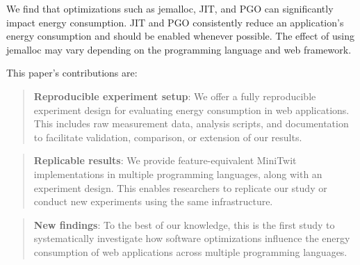 \documentclass[../main.tex]{subfiles}
\begin{document}
We find that optimizations such as jemalloc, JIT, and PGO can significantly impact energy consumption. JIT and PGO consistently reduce an application's energy consumption and should be enabled whenever possible. The effect of using jemalloc may vary depending on the programming language and web framework.

This paper's contributions are:

\begin{quote}
    \textbf{Reproducible experiment setup}: We offer a fully reproducible experiment design for evaluating energy consumption in web applications. This includes raw measurement data, analysis scripts, and documentation to facilitate validation, comparison, or extension of our results.
\end{quote}

\begin{quote}
    \textbf{Replicable results}: We provide feature-equivalent MiniTwit implementations in multiple programming languages, along with an experiment design. This enables researchers to replicate our study or conduct new experiments using the same infrastructure.
\end{quote}

\begin{quote}
    \textbf{New findings}: To the best of our knowledge, this is the first study to systematically investigate how software optimizations influence the energy consumption of web applications across multiple programming languages.
\end{quote}
\end{document}
